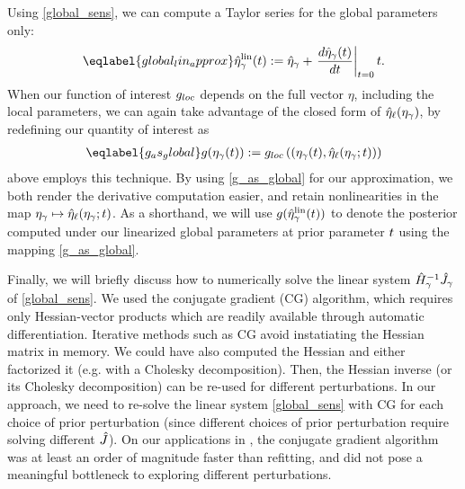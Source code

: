 Using \eqref{global_sens}, we can compute a Taylor series for the
global parameters only:
%
\begin{align}\eqlabel{global_lin_approx}
  \etalin_\gamma(\t) := \etaopt_\gamma +
  \fracat{d \etaopt_\gamma(\t)}{d \t}{\t=0} \t .
\end{align}
%
When our function of interest $g_{loc}$ depends on the full vector $\eta$,
including the local parameters, we can again take advantage of the closed form
of $\hat\eta_{\ell}(\eta_{\gamma})$, by redefining our quantity of interest as
%
\begin{align}\eqlabel{g_as_global}
\g(\etaglob(\t)) :=
    \g_{loc}\left(
        \left(\etaglob(\t), \etaoptlocal(\etaglob; \t) \right) \right)
\end{align}
%
 above employs this technique. By using
\eqref{g_as_global} for our approximation, we both render the derivative
computation easier, and retain nonlinearities in the map $\eta_{\gamma} \mapsto
\hat\eta_{\ell}(\eta_{\gamma}; t)$.  As a shorthand, we will use
$g(\hat\eta^{\mathrm{lin}}_\gamma(t))$ to denote the posterior computed under our linearized
global parameters at prior parameter $t$ using the mapping \eqref{g_as_global}.

Finally, we will briefly discuss how to numerically solve the linear system
$\hat{H}_\gamma^{-1}\hat J_\gamma$ of \eqref{global_sens}.  We used the
conjugate gradient (CG) algorithm, which requires only Hessian-vector products
which are readily available through automatic differentiation. Iterative methods
such as CG avoid instatiating the Hessian matrix in memory. We could have also
computed the Hessian and either factorized it (e.g. with a Cholesky
decomposition). Then, the Hessian inverse (or its Cholesky decomposition) can be
re-used for different perturbations. In our approach, we need to re-solve the
linear system \eqref{global_sens} with CG for each choice of prior perturbation
(since different choices of prior perturbation require solving different
$\hat J$). On our applications in , the conjugate
gradient algorithm was at least an order of magnitude faster than refitting, and
did not pose a meaningful bottleneck to exploring different perturbations.
